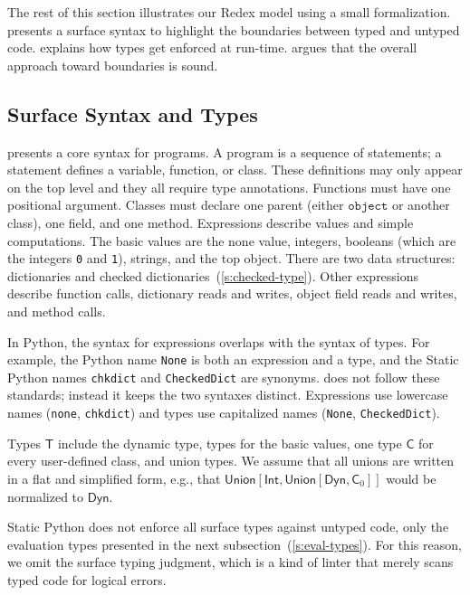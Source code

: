\documentclass[english,cleveref,submission]{programming}
\newcommand{\SP}{Static Python}
\newcommand{\code}[1]{\texttt{#1}}
\newcommand{\typefont}[1]{\mathsf{#1}}
\newcommand{\paramtype}[2]{#1[#2]}
\newcommand{\sptype}{\typefont{T}}
\newcommand{\sptclass}{\typefont{C}}
\newcommand{\sptint}{\typefont{Int}}
\newcommand{\sptdyn}{\typefont{Dyn}}
\newcommand{\sptunion}[1]{\paramtype{\typefont{Union}}{#1}}
\newcommand{\spobject}{\code{object}}
\begin{document}
The rest of this section illustrates our Redex model using
a small formalization.
 presents a surface syntax to highlight the boundaries between
typed and untyped code.
 explains how types get enforced at run-time.
 argues that the overall approach toward boundaries is sound.


\subsection{Surface Syntax and Types}
\label{s:surface}

 presents a core syntax for programs.
A program is a sequence of statements;
a statement defines a variable, function, or class.
These definitions may only appear on the top level
and they all require type annotations.
Functions must have one positional argument.
Classes must declare one parent (either $\spobject$ or another class), one field, and one method.
Expressions describe values and simple computations.
The basic values are the none value, integers,
booleans (which are the integers \code{0} and \code{1}), strings, and the top object.
There are two data structures: dictionaries and checked dictionaries~(\cref{s:checked-type}).
Other expressions describe function calls, dictionary reads and writes, object field reads and writes,
and method calls.

In Python, the syntax for expressions overlaps with the syntax of types.
For example, the Python name \code{None} is both an expression and a type,
and the \SP{} names \code{chkdict} and \code{CheckedDict} are synonyms.
 does not follow these standards; instead it keeps the two syntaxes distinct.
Expressions use lowercase names (\code{none}, \code{chkdict}) and types use capitalized
names (\code{None}, \code{CheckedDict}).

Types $\sptype$ include the dynamic type, types for the basic values, one type $\sptclass$ for every
user-defined class, and union types.
We assume that all unions are written in a flat and simplified form, e.g., that
$\sptunion{\sptint, \sptunion{\sptdyn, \sptclass_0}}$ would be normalized to $\sptdyn$.

\SP{} does not enforce all surface types against untyped code, only the evaluation
types presented in the next subsection~(\cref{s:eval-types}).
For this reason, we omit the surface typing judgment, which is a kind of linter
that merely scans typed code for logical errors.
\end{document}
